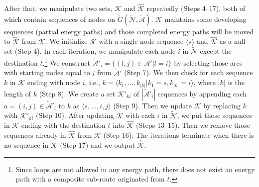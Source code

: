\documentclass[journal]{IEEEtran}
\begin{document}
After that, we manipulate two sets, $\mathcal{K}$ and $\hat{\mathcal{K}}$ repeatedly (Steps 4--17), both of which contain sequences of nodes on $\tilde{G}(\tilde{\mathcal{N}},\tilde{\mathcal{A}})$. $\mathcal{K}$ maintains some developing sequences (partial energy paths) and those completed energy paths will be moved to  $\hat{\mathcal{K}}$ from $\mathcal{K}$. We initialize $\mathcal{K}$ with a single-node sequence $\langle s \rangle$ and $\hat{\mathcal{K}}$ as a null set (Step 4). In each iteration, we manipulate each node $i$ in $\tilde{\mathcal{N}}$ except the destination $t$.\footnote{Since loops are not allowed in any energy path, there does not exist an energy path with a composite sub-route originated from $t$.} We construct $\tilde{\mathcal{A}}'_i =\{(l,j)\in \tilde{\mathcal{A}}'|l=i\}$ by selecting those arcs with starting nodes equal to $i$ from $\tilde{\mathcal{A}}'$ (Step 7). We then check for each sequence $k$ in $\mathcal{K}$ ending with node $i$, i.e., $k=\langle k_1,\ldots, k_{|k|} | k_1=s, k_{|k|}=i \rangle$, where $|k|$ is the length of $k$ (Step 8). We create a set $\mathcal{K}'_{ki}$ of $|\tilde{\mathcal{A}}'_i|$ sequences by appending each $a=(i,j)\in \tilde{\mathcal{A}}'_i$ to $k$ as $\langle s,\ldots,i,j \rangle$ (Step 9). Then we update $\mathcal{K}$ by replacing $k$ with $\mathcal{K}'_{ki}$ (Step 10). After updating $\mathcal{K}$ with each $i$ in $\tilde{\mathcal{N}}$, we put those sequences in  $\mathcal{K}$ ending with the destination $t$ into $\hat{\mathcal{K}}$ (Steps 13--15). Then we remove those sequences already in $\hat{\mathcal{K}}$ from $\mathcal{K}$ (Step 16). The iterations terminate when there is no sequence in $\mathcal{K}$ (Step 17) and we output $\hat{\mathcal{K}}$.
\end{document}
